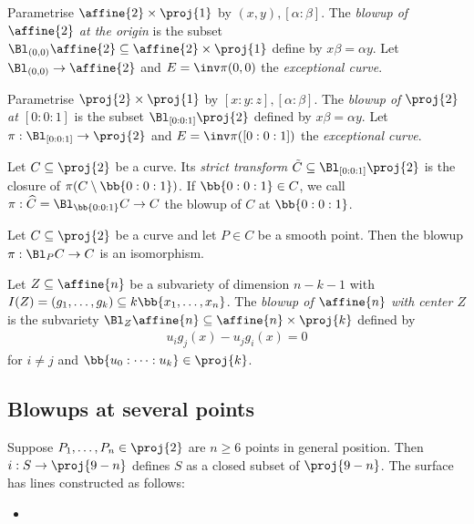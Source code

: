 \documentclass{article}
\begin{document}
\begin{definition}
  Parametrise $\affine{2}\times\proj{1}$ by $(x,y),[\alpha:\beta]$. The \emph{blowup
  of $\affine{2}$ at the origin} is the subset $\Bl_{(0,0)}\affine{2}\subseteq\affine{2}\times\proj{1}$
  define by $x\beta = \alpha y$.
  Let $\Bl_{(0,0)}\to\affine{2}$ and $E=\inv\pi(0,0)$ the \emph{exceptional curve}.
\end{definition}

\begin{definition}
  Parametrise $\proj{2}\times\proj{1}$ by $[x:y:z],[\alpha:\beta]$. The
  \emph{blowup of $\proj{2}$ at $[0:0:1]$} is the subset
  $\Bl_{[0:0:1]}\proj{2}$ defined by $x\beta = \alpha y$. Let
  $\pi:\Bl_{[0:0:1]}\to\proj{2}$ and $E=\inv\pi([0:0:1])$ the \emph{exceptional
  curve}.
\end{definition}

\begin{definition}
  Let $C\subseteq\proj{2}$ be a curve. Its \emph{strict transform}
  $\tilde C\subseteq\Bl_{[0:0:1]}\proj{2}$ is the closure of
  $\pi(C\setminus\bb{0:0:1})$. If $\bb{0:0:1}\in C$, we call
  $\pi:\widehat C=\Bl_{\bb{0:0:1}} C\to C$ the blowup of $C$ at
  $\bb{0:0:1}$.
\end{definition}

\begin{proposition}
  Let $C\subseteq\proj{2}$ be a curve and let $P\in C$ be a smooth point.
  Then the blowup $\pi:\Bl_P C\to C$ is an isomorphism.
\end{proposition}

\begin{definition}
  Let $Z\subseteq\affine{n}$ be a subvariety of dimension $n-k-1$ with
  $I(Z) = (g_1,\ldots,g_k)\subseteq k\bb{x_1,\ldots,x_n}$.
  The \emph{blowup of $\affine{n}$ with center $Z$} is the subvariety
  $\Bl_Z\affine{n}\subseteq\affine{n}\times\proj{k}$ defined by
  \begin{align*}
    u_i g_j(x) - u_j g_i(x) = 0
  \end{align*}
  for $i\neq j$ and $\bb{u_0:\cdots:u_k}\in\proj{k}$.
\end{definition}

\subsection{Blowups at several points}

\begin{proposition}
  Suppose $P_1,\ldots,P_n\in\proj{2}$ are $n\geq 6$ points in general
  position. Then $i:S\to\proj{9-n}$ defines $S$ as a closed subset of
  $\proj{9-n}$. The surface has lines constructed as follows:
  \begin{itemize}
  \item  
  \end{itemize}
\end{proposition}
\end{document}
